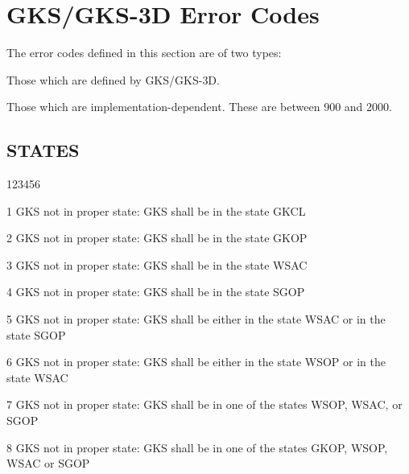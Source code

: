 \chapter{GKS/GKS-3D Error Codes}
 
The error codes defined in this section are of two types:
\begin{OL}
\item Those which are defined by GKS/GKS-3D.
\item Those which are implementation-dependent.
These are between 900 and 2000.
\end{OL}
\section{STATES}
\begin{DLtt}{123456}
\item[1]
GKS not in proper state: GKS shall be in the state GKCL
\item[2]
GKS not in proper state: GKS shall be in the state GKOP
\item[3]
GKS not in proper state: GKS shall be in the state WSAC
\item[4]
GKS not in proper state: GKS shall be in the state SGOP
\item[5]
GKS not in proper state: GKS shall be either in the state WSAC or in
the state SGOP
\item[6]
GKS not in proper state: GKS shall be either in the state WSOP or in
the state WSAC
\item[7]
GKS not in proper state: GKS shall be in one of the states WSOP, WSAC,
or SGOP
\item[8]
GKS not in proper state: GKS shall be in one of the states GKOP, WSOP,
WSAC or SGOP
\end{DLtt}
